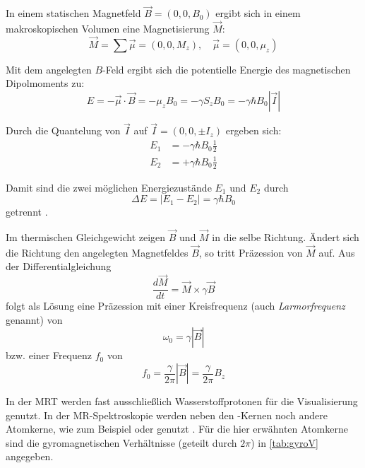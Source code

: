 In einem statischen Magnetfeld $\vec{B}=(0,0,B_0)$ ergibt sich in einem makroskopischen Volumen eine Magnetisierung $\vec{M}$:
\begin{equation}
	\vec{M} = \sum \vec{\mu} = (0,0,M_z), \quad \vec{\mu}=(0,0,\mu_z)
\end{equation}

Mit dem angelegten $B$-Feld ergibt sich die potentielle Energie des magnetischen Dipolmoments zu:
\begin{equation}
	E=-\vec{\mu} \cdot \vec{B} = -\mu_z B_0 = -\gamma S_z B_0 = -\gamma \hbar B_0 |\vec{I}|
\end{equation}

Durch die Quantelung von $\vec{I}$ auf $\vec{I}=(0,0,\pm I_z)$ ergeben sich:
\begin{subequations}
	\begin{align}
	E_1 & = -\gamma \hbar B_0 \frac{1}{2} \\
	E_2 & = +\gamma \hbar B_0 \frac{1}{2}
	\end{align}
\end{subequations}

Damit sind die zwei möglichen Energiezustände $E_1$ und $E_2$ durch
\begin{equation}
	\Delta E = |E_1 - E_2| = \gamma \hbar B_0
\end{equation}
getrennt \cite[S.~ 56]{Nishimura1996}.

Im thermischen Gleichgewicht zeigen $\vec{B}$ und $\vec{M}$ in die selbe Richtung. Ändert sich die Richtung den angelegten Magnetfeldes $\vec{B}$, so tritt Präzession von $\vec{M}$ auf. Aus der Differentialgleichung
\begin{equation}
\label{eq:Mdgl}
	\frac{d\vec{M}}{dt}=\vec{M} \times \gamma \vec{B}
\end{equation}
folgt als Lösung eine Präzession mit einer Kreisfrequenz (auch \textit{Larmorfrequenz} genannt) von
\begin{equation}
	\omega_0=\gamma |\vec{B}|
\end{equation}
bzw. einer Frequenz $f_0$ von
\begin{equation}
	f_0=\frac{\gamma}{2\pi} |\vec{B}| = \frac{\gamma}{2\pi} B_z
\end{equation}

In der MRT werden fast ausschließlich Wasserstoffprotonen für die Visualisierung genutzt. In der MR-Spektroskopie werden neben den -Kernen noch andere Atomkerne, wie zum Beispiel  oder  genutzt \cite{Andrade2014}. Für die hier erwähnten Atomkerne sind die gyromagnetischen Verhältnisse (geteilt durch $2\pi$) in \autoref{tab:gyroV} angegeben.

